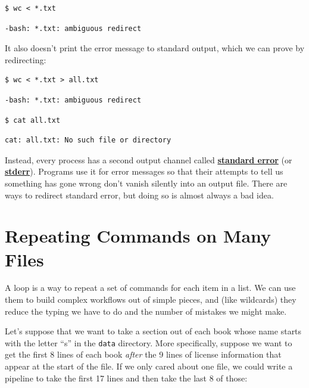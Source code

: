 \documentclass[
]{krantz}
\newcommand{\gref}[2]{\hyperlink{#2}{\textbf{#1}}}
\begin{document}
\begin{verbatim}
$ wc < *.txt
\end{verbatim}

\begin{verbatim}
-bash: *.txt: ambiguous redirect
\end{verbatim}

It also doesn't print the error message to standard output,
which we can prove by redirecting:

\begin{verbatim}
$ wc < *.txt > all.txt
\end{verbatim}

\begin{verbatim}
-bash: *.txt: ambiguous redirect
\end{verbatim}

\begin{verbatim}
$ cat all.txt
\end{verbatim}

\begin{verbatim}
cat: all.txt: No such file or directory
\end{verbatim}

Instead,
every process has a second output channel called \gref{standard error}{stderr}
(or \gref{stderr}{stderr}).
Programs use it for error messages
so that their attempts to tell us something has gone wrong don't vanish silently into an output file.
There are ways to redirect standard error,
but doing so is almost always a bad idea.

\hypertarget{bash-basics-loops}{%
\section{Repeating Commands on Many Files}\label{bash-basics-loops}}

A loop is a way to repeat a set of commands for each item in a list.
We can use them to build complex workflows out of simple pieces,
and (like wildcards)
they reduce the typing we have to do and the number of mistakes we might make.

Let's suppose that we want to take a section out of each book
whose name starts with the letter ``s'' in the \texttt{data} directory.
More specifically,
suppose we want to get the first 8 lines of each book
\emph{after} the 9 lines of license information that appear at the start of the file.
If we only cared about one file,
we could write a pipeline to take the first 17 lines
and then take the last 8 of those:
\end{document}
